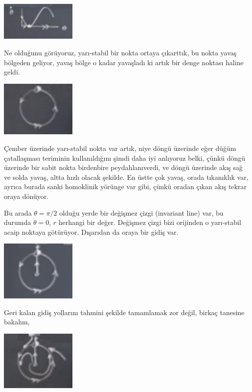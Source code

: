 \documentclass[12pt,fleqn]{article}\usepackage{../../common}
\begin{document}
\includegraphics[width=10em]{14_11.png}

Ne olduğunu görüyoruz, yarı-stabil bir nokta ortaya çıkarttık, bu nokta
yavaş bölgeden geliyor, yavaş bölge o kadar yavaşladı ki artık bir denge
noktası haline geldi. 

\includegraphics[width=10em]{14_12.png}

Çember üzerinde yarı-stabil nokta var artık, niye döngü üzerinde eğer
düğüm çatallaşması teriminin kullanıldığını şimdi daha iyi anlıyoruz belki,
çünkü döngü üzerinde bir sabit nokta birdenbire peydahlanıverdi, ve döngü
üzerinde akış sağ ve solda yavaş, altta hızlı olacak şekilde. En üstte çok
yavaş, orada tıkanıklık var, ayrıca burada sanki homoklinik yörünge var
gibi, çünkü oradan çıkan akış tekrar oraya dönüyor. 

Bu arada $\theta = \pi/2$ olduğu yerde bir değişmez çizgi (invariant line)
var, bu durumda $\dot{\theta} = 0$, $r$ herhangi bir değer. Değişmez çizgi
bizi orijinden o yarı-stabil acaip noktaya götürüyor. Dışarıdan da oraya
bir gidiş var.

\includegraphics[width=10em]{14_13.png}

Geri kalan gidiş yollarını tahmini şekilde tamamlamak zor değil, birkaç
tanesine bakalım,

\includegraphics[width=10em]{14_14.png}
\end{document}
